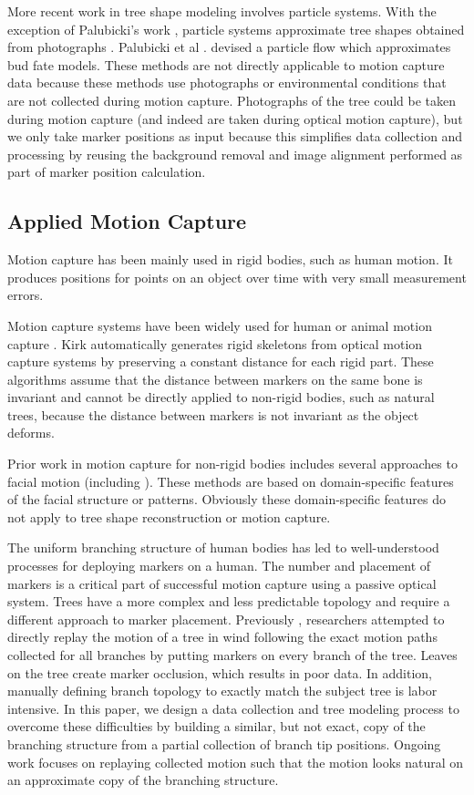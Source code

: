 More recent work in tree shape modeling involves particle systems. With the exception of Palubicki's work \cite{palubicki:siggraph09}, particle systems approximate tree shapes obtained from photographs \cite{RecheMartinez2004,neubert:acmtg07,Tan:2007:ITM}. Palubicki et al . devised a particle flow which approximates bud fate models. These methods are not directly applicable to motion capture data because these methods use photographs or environmental conditions that are not collected during motion capture.  Photographs of the tree could be taken during motion capture (and indeed are taken during optical motion capture), but we only take marker positions as input because this simplifies data collection and processing by reusing the background removal and image alignment performed as part of marker position calculation.

\subsection{Applied Motion Capture}

Motion capture has been mainly used in rigid bodies, such as human motion. It produces positions for points on an object over time with very small measurement errors.

Motion capture systems have been widely used for human or animal motion capture \cite{Lou:EHM2010,Rajko:2007:RAK,Wen:2006:MCD}. Kirk \cite{Kirk:2005:SPE} automatically generates rigid skeletons from optical motion capture systems by preserving a constant distance for each rigid part. These algorithms assume that the distance between markers on the same bone is invariant and cannot be directly applied to non-rigid bodies, such as natural trees, because the distance between markers is not invariant as the object deforms. 

Prior work in motion capture for non-rigid bodies includes several approaches to facial motion (including \cite{Ma:FPS2008,SifakisEftychios2005}). These methods are based on domain-specific features of the facial structure or patterns. Obviously these domain-specific features do not apply to tree shape reconstruction or motion capture.

The uniform branching structure of human bodies has led to well-understood processes for deploying markers on a human. The number and placement of markers is a critical part of successful motion capture using a passive optical system. Trees have a more complex and less predictable topology and require a different approach to marker placement. Previously \cite{Long:MCN2010}, researchers attempted to directly replay the motion of a tree in wind following the exact motion paths collected for all branches by putting markers on every branch of the tree. Leaves on the tree create marker occlusion, which results in poor data. In addition, manually defining branch topology to exactly match the subject tree is labor intensive. In this paper, we design a data collection and tree modeling process to overcome these difficulties by building a similar, but not exact, copy of the branching structure from a partial collection of branch tip positions. Ongoing work focuses on replaying collected motion such that the motion looks natural on an approximate copy of the branching structure.

